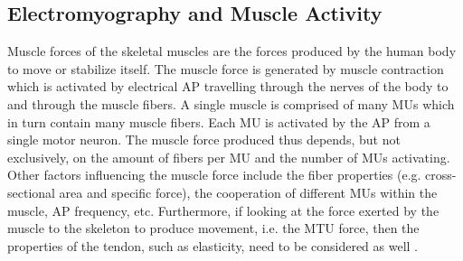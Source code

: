 \documentclass[../main.tex]{subfiles}
\begin{document}




\subsection{Electromyography and Muscle Activity}
\label{sec:A-EMG}
Muscle forces of the skeletal muscles are the forces produced by the human body to move or stabilize itself. 
The muscle force is generated by muscle contraction which is activated by electrical \ac{AP} travelling through the nerves of the body to and through the muscle fibers. 
A single muscle is comprised of many \acp{MU} which in turn contain many muscle fibers.
Each \ac{MU} is activated by the \ac{AP} from a single motor neuron.
The muscle force produced thus depends, but not exclusively, on the amount of fibers per \ac{MU} and the number of \acp{MU} activating.
Other factors influencing the muscle force include the fiber properties (e.g. cross-sectional area and specific force), the cooperation of different \acp{MU} within the muscle, \ac{AP} frequency, etc.
Furthermore, if looking at the force exerted by the muscle to the skeleton to produce movement, i.e. the \ac{MTU} force, then the properties of the tendon, such as elasticity, need to be considered as well \cite{Pizzolato2015, Enoka2016, Farina2016}. 
\end{document}
